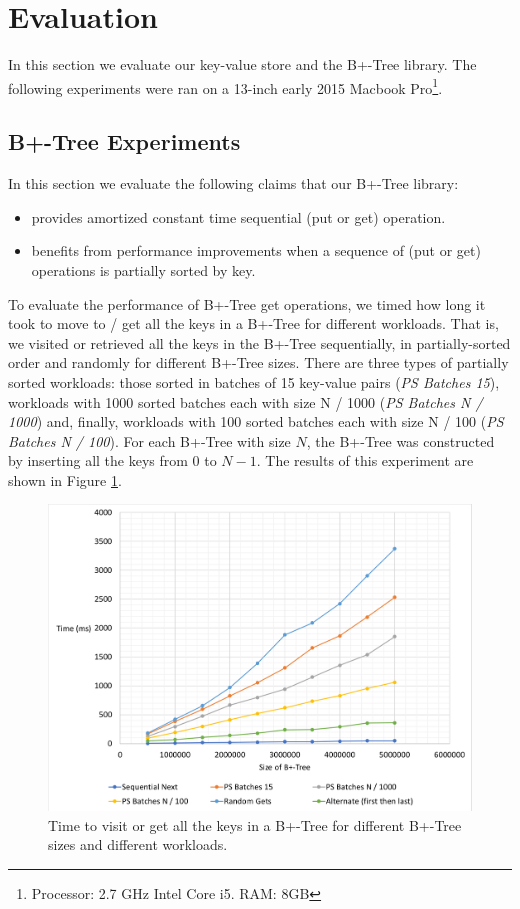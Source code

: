 \section{Evaluation} \label{sec:Evaluation}

In this section we evaluate our key-value store and the B+-Tree library. The following experiments were ran on a 13-inch early 2015 Macbook Pro\footnote{Processor: 2.7 GHz Intel Core i5. RAM: 8GB}.

\subsection{B+-Tree Experiments}

In this section we evaluate the following claims that our B+-Tree library: 
\begin{itemize}
    \item provides amortized constant time sequential (put or get) operation.
    \item benefits from performance improvements when a sequence of (put or get) operations is partially sorted by key.
\end{itemize}

To evaluate the performance of B+-Tree get operations, we timed how long it took to move to / get all the keys in a B+-Tree for different workloads. That is, we visited or retrieved all the keys in the B+-Tree sequentially, in partially-sorted order and randomly for different B+-Tree sizes. There are three types of partially sorted workloads: those sorted in batches of 15 key-value pairs (\textit{PS Batches 15}), workloads with 1000 sorted batches each with size N / 1000 (\textit{PS Batches N / 1000}) and, finally, workloads with 100 sorted batches each with size N / 100 (\textit{PS Batches N / 100}).  For each B+-Tree with size $N$, the B+-Tree was constructed by inserting all the keys from $0$ to $N - 1$. The results of this experiment are shown in Figure \ref{fig:B+GetsGraph}. 


\begin{figure}[hbtp]
    \centering
    \includegraphics[scale=0.50]{figures/Btreegetsgraph.png}
    \caption{Time to visit or get all the keys in a B+-Tree for different B+-Tree sizes and different workloads.}
    \label{fig:B+GetsGraph}
\end{figure}

